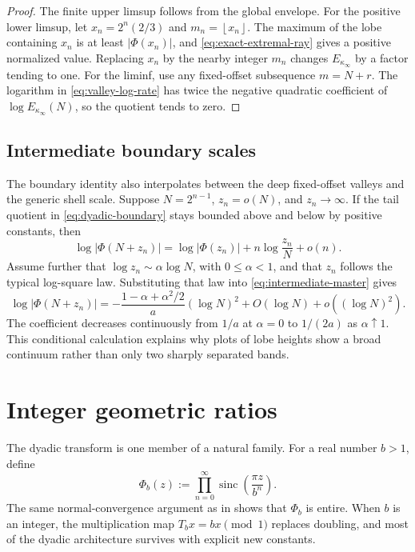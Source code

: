 \documentclass[11pt,oneside]{article}
\numberwithin{equation}{section}
\theoremstyle{definition}
\theoremstyle{remark}
\newcommand{\abs}[1]{\left|#1\right|}
\newcommand{\floor}[1]{\left\lfloor#1\right\rfloor}
\newcommand{\sinc}{\operatorname{sinc}}
\newcommand{\PhiUp}{\Phi}
\newcommand{\defeq}{\mathrel{:=}}
\begin{document}
\begin{proof}
The finite upper limsup follows from the global envelope.  For the positive lower limsup,
let \(x_n=2^n(2/3)\) and \(m_n=\floor{x_n}\).  The maximum of the lobe containing
\(x_n\) is at least \(\abs{\PhiUp(x_n)}\), and
\eqref{eq:exact-extremal-ray} gives a positive normalized value.  Replacing \(x_n\) by the
nearby integer \(m_n\) changes \(E_{\kappa_\infty}\) by a factor tending to one.
For the liminf, use any fixed-offset subsequence \(m=N+r\).  The logarithm in
\eqref{eq:valley-log-rate} has twice the negative quadratic coefficient of
\(\log E_{\kappa_\infty}(N)\), so the quotient tends to zero.
\end{proof}

\subsection{Intermediate boundary scales}

The boundary identity also interpolates between the deep fixed-offset valleys and the
generic shell scale.  Suppose \(N=2^{n-1}\), \(z_n=o(N)\), and \(z_n\to\infty\).  If
the tail quotient in \eqref{eq:dyadic-boundary} stays bounded above and below by positive
constants, then
\begin{equation}
 \log\abs{\PhiUp(N+z_n)}
 =\log\abs{\PhiUp(z_n)}+n\log\frac{z_n}{N}+o(n).
 \label{eq:intermediate-master}
\end{equation}
Assume further that \(\log z_n\sim\alpha\log N\), with \(0\le\alpha<1\), and that
\(z_n\) follows the typical log-square law.  Substituting that law into
\eqref{eq:intermediate-master} gives
\begin{equation}
 \log\abs{\PhiUp(N+z_n)}
 =-\frac{1-\alpha+\alpha^2/2}{a}(\log N)^2
  +O(\log N)+o((\log N)^2).
 \label{eq:intermediate-quadratic}
\end{equation}
The coefficient decreases continuously from \(1/a\) at \(\alpha=0\) to
\(1/(2a)\) as \(\alpha\uparrow1\).  This conditional calculation explains why plots of
lobe heights show a broad continuum rather than only two sharply separated bands.

\section{Integer geometric ratios}
\label{sec:integer-base}

The dyadic transform is one member of a natural family.  For a real number \(b>1\), define
\begin{equation}
 \Phi_b(z)
 \defeq\prod_{n=0}^{\infty}
 \sinc\!\left(\frac{\pi z}{b^n}\right).
 \label{eq:Phi-b}
\end{equation}
The same normal-convergence argument as in  shows that \(\Phi_b\) is
entire.  When \(b\) is an integer, the multiplication map
\(T_bx=bx\pmod1\) replaces doubling, and most of the dyadic architecture survives with
explicit new constants.
\end{document}
